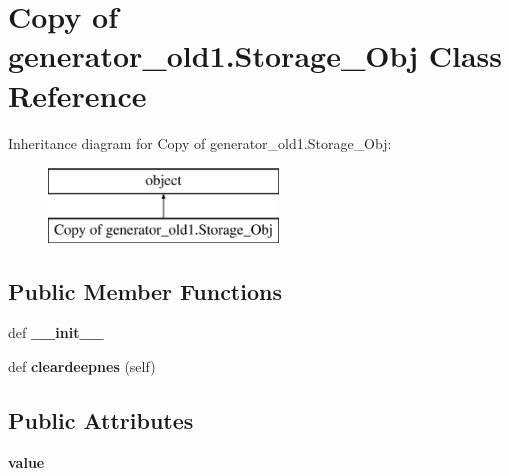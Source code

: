 \hypertarget{class_copy_01of_01generator__old1_1_1_storage___obj}{}\section{Copy of generator\+\_\+old1.\+Storage\+\_\+\+Obj Class Reference}
\label{class_copy_01of_01generator__old1_1_1_storage___obj}
Inheritance diagram for Copy of generator\+\_\+old1.\+Storage\+\_\+\+Obj\+:\begin{figure}[H]
\begin{center}
\leavevmode
\includegraphics[height=2.000000cm]{class_copy_01of_01generator__old1_1_1_storage___obj}
\end{center}
\end{figure}
\subsection*{Public Member Functions}
\begin{DoxyCompactItemize}
\item 
\hypertarget{class_copy_01of_01generator__old1_1_1_storage___obj_aee37d3320d618e7d0bc85a52bc284b20}{}def {\bfseries \+\_\+\+\_\+init\+\_\+\+\_\+}\label{class_copy_01of_01generator__old1_1_1_storage___obj_aee37d3320d618e7d0bc85a52bc284b20}

\item 
\hypertarget{class_copy_01of_01generator__old1_1_1_storage___obj_a0675c339f98a8bc43f910d10b9d166a7}{}def {\bfseries cleardeepnes} (self)\label{class_copy_01of_01generator__old1_1_1_storage___obj_a0675c339f98a8bc43f910d10b9d166a7}

\end{DoxyCompactItemize}
\subsection*{Public Attributes}
\begin{DoxyCompactItemize}
\item 
\hypertarget{class_copy_01of_01generator__old1_1_1_storage___obj_a9f8e4e08e1758a111b6920e415407eee}{}{\bfseries value}\label{class_copy_01of_01generator__old1_1_1_storage___obj_a9f8e4e08e1758a111b6920e415407eee}

\end{DoxyCompactItemize}


